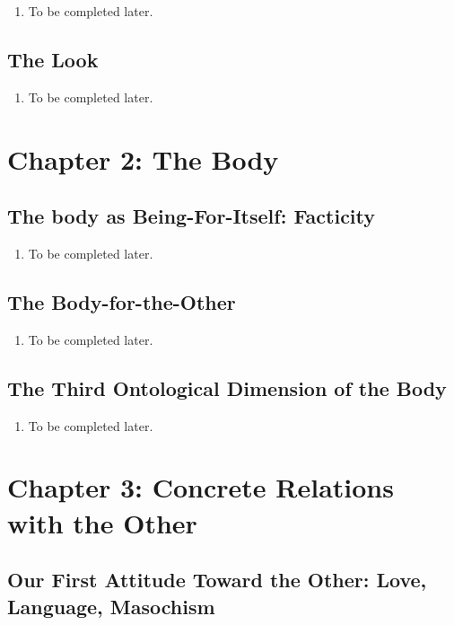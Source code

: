 \begin{enumerate}
  \item To be completed later.
\end{enumerate}

\subsection{The Look}

\begin{enumerate}
  \item To be completed later.
\end{enumerate}

\section{Chapter 2: The Body}

\subsection{The body as Being-For-Itself: Facticity}

\begin{enumerate}
  \item To be completed later.
\end{enumerate}

\subsection{The Body-for-the-Other}

\begin{enumerate}
  \item To be completed later.
\end{enumerate}

\subsection{The Third Ontological Dimension of the Body}

\begin{enumerate}
  \item To be completed later.
\end{enumerate}

\section{Chapter 3: Concrete Relations with the Other}

\subsection{Our First Attitude Toward the Other: Love, Language, Masochism}

